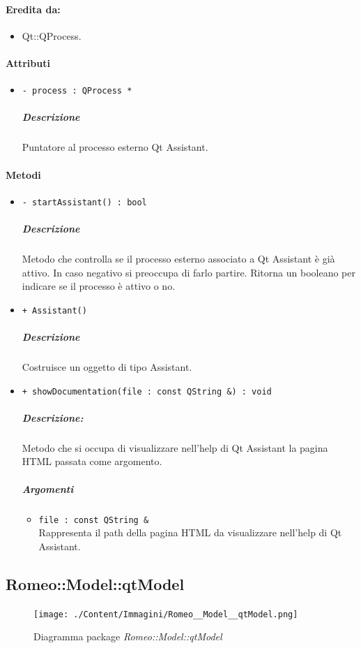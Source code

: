 	\paragraph{Eredita da:}
		\begin{itemize}
			\item Qt::QProcess.
		\end{itemize}
	\paragraph{Attributi}
		\begin{itemize}
			\item \color{teal} \verb!- process : QProcess *!
			\color{black}
			\subparagraph{Descrizione} Puntatore al processo esterno Qt Assistant.
		\end{itemize}
	\paragraph{\color{black}Metodi}
		\begin{itemize}
			\item \color{blue} \verb!- startAssistant() : bool!
			\color{black}
			\subparagraph{Descrizione} Metodo che controlla se il processo esterno associato a Qt Assistant è già attivo.
In caso negativo si preoccupa di farlo partire.
Ritorna un booleano per indicare se il processo è attivo o no.
			\item \color{blue} \verb!+ Assistant()!
			\color{black}
			\subparagraph{Descrizione} Costruisce un oggetto di tipo Assistant.
			\item \color{blue} \verb!+ showDocumentation(file : const QString &) : void!
			\color{black}
			\subparagraph{Descrizione:} Metodo che si occupa di visualizzare nell'help di Qt Assistant la pagina HTML passata come argomento.
			\color{black}
			\subparagraph{Argomenti}
			\begin{itemize}
				\item \color{RoyalPurple} \verb!file : const QString &!\\				
\color{black} Rappresenta il path della pagina HTML da visualizzare nell'help di Qt Assistant.
			\end{itemize}
		\end{itemize}
\subsection{Romeo::Model::qtModel}
	\begin{figure} [!h]
		\centering
		\texttt{[image: ./Content/Immagini/Romeo\_\_Model\_\_qtModel.png]}
		\caption{Diagramma package \textsl{Romeo::Model::qtModel}}
	\end{figure}
